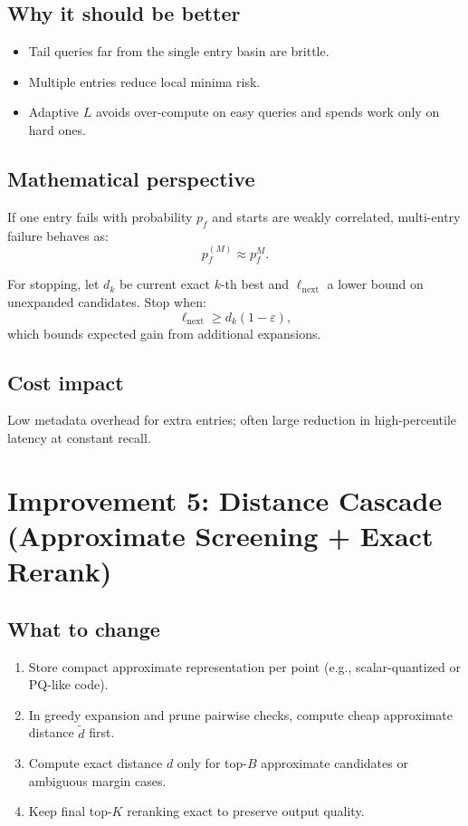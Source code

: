 \documentclass[11pt]{article}
\begin{document}
\subsection{Why it should be better}
\begin{itemize}[leftmargin=*]
    \item Tail queries far from the single entry basin are brittle.
    \item Multiple entries reduce local minima risk.
    \item Adaptive $L$ avoids over-compute on easy queries and spends work only on hard ones.
\end{itemize}

\subsection{Mathematical perspective}
If one entry fails with probability $p_f$ and starts are weakly correlated, multi-entry failure behaves as:
\begin{equation}
 p_f^{(M)} \approx p_f^M.
\end{equation}

For stopping, let $d_k$ be current exact $k$-th best and $\ell_{\text{next}}$ a lower bound on unexpanded candidates. Stop when:
\begin{equation}
\ell_{\text{next}} \ge d_k(1-\varepsilon),
\end{equation}
which bounds expected gain from additional expansions.

\subsection{Cost impact}
Low metadata overhead for extra entries; often large reduction in high-percentile latency at constant recall.

\section{Improvement 5: Distance Cascade (Approximate Screening + Exact Rerank)}

\subsection{What to change}
\begin{enumerate}[leftmargin=*]
    \item Store compact approximate representation per point (e.g., scalar-quantized or PQ-like code).
    \item In greedy expansion and prune pairwise checks, compute cheap approximate distance $\tilde d$ first.
    \item Compute exact distance $d$ only for top-$B$ approximate candidates or ambiguous margin cases.
    \item Keep final top-$K$ reranking exact to preserve output quality.
\end{enumerate}
\end{document}
